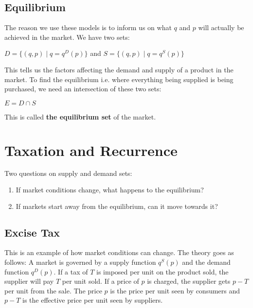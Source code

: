 \documentclass[12pt, letterpaper]{article}
\begin{document}
\subsection{Equilibrium}
The reason we use these models is to inform us on what $q$ and $p$ will actually be achieved in the market. We have two sets:
\begin{center}
	$D = \{(q,p) \;|\; q = q^D(p)\}$ and $S = \{(q,p)\;|\; q = q^S(p)\}$
\end{center}
This tells us the factors affecting the demand and supply of a product in the market. To find the equilibrium i.e. where everything being supplied is being purchased, we need an intersection of these two sets:
\begin{center}
	$E = D \cap S$
\end{center}
This is called \textbf{the equilibrium set} of the market.

\section{Taxation and Recurrence}
Two questions on supply and demand sets:
\begin{enumerate}
	\item If market conditions change, what happens to the equilibrium?
	\item If markets start away from the equilibrium, can it move towards it?
\end{enumerate}
\subsection{Excise Tax}
This is an example of how market conditions can change.
The theory goes as follows: A market is governed by a supply function $q^S(p)$ and the demand function $q^D(p)$. If a tax of $T$ is imposed per unit on the product sold, the supplier will pay $T$ per unit sold.
If a price of $p$ is charged, the supplier gets $p-T$ per unit from the sale.
The price $p$ is the price per unit seen by consumers and $p-T$ is the effective price per unit seen by suppliers.
\end{document}
